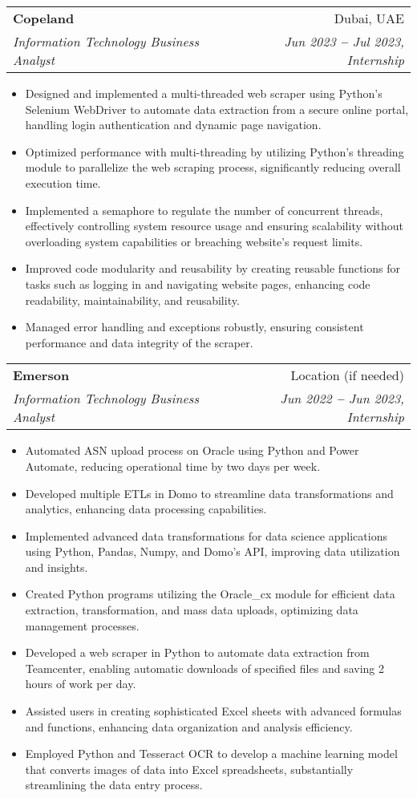 \documentclass[letterpaper,11pt]{article}
\makeatletter
\newcommand{\resumeItem}[1]{
  \item\small{
    {#1 \vspace{-2pt}}
  }
}
\newcommand{\resumeSubheading}[4]{
  \vspace{-2pt}\item
    \begin{tabular*}{0.97\textwidth}[t]{l@{\extracolsep{\fill}}r}
      \textbf{#1} & #2 \\
      \textit{\small#3} & \textit{\small #4} \\
    \end{tabular*}\vspace{-7pt}
}
\newcommand{\resumeItemListStart}{\begin{itemize}}
\newcommand{\resumeItemListEnd}{\end{itemize}\vspace{-5pt}}
\makeatother
\begin{document}
            \vspace{20pt}
            \resumeSubheading
            {Copeland}{Dubai, UAE}
            {Information Technology Business Analyst}{Jun 2023 \textbf{--} Jul 2023, Internship}
              \resumeItemListStart
                  \resumeItem{Designed and implemented a multi-threaded web scraper using Python's Selenium WebDriver to automate data extraction from a secure online portal, handling login authentication and dynamic page navigation.}
                  \resumeItem{Optimized performance with multi-threading by utilizing Python's threading module to parallelize the web scraping process, significantly reducing overall execution time.}
                  \resumeItem{Implemented a semaphore to regulate the number of concurrent threads, effectively controlling system resource usage and ensuring scalability without overloading system capabilities or breaching website's request limits.}
                  \resumeItem{Improved code modularity and reusability by creating reusable functions for tasks such as logging in and navigating website pages, enhancing code readability, maintainability, and reusability.}
                  \resumeItem{Managed error handling and exceptions robustly, ensuring consistent performance and data integrity of the scraper.}
              \resumeItemListEnd
          

            \vspace{20pt}
            \resumeSubheading
            {Emerson}{Location (if needed)}
            {Information Technology Business Analyst}{Jun 2022 \textbf{--} Jun 2023, Internship}
              \resumeItemListStart
                  \resumeItem{Automated ASN upload process on Oracle using Python and Power Automate, reducing operational time by two days per week.}
                  \resumeItem{Developed multiple ETLs in Domo to streamline data transformations and analytics, enhancing data processing capabilities.}
                  \resumeItem{Implemented advanced data transformations for data science applications using Python, Pandas, Numpy, and Domo's API, improving data utilization and insights.}
                  \resumeItem{Created Python programs utilizing the Oracle\_cx module for efficient data extraction, transformation, and mass data uploads, optimizing data management processes.}
                  \resumeItem{Developed a web scraper in Python to automate data extraction from Teamcenter, enabling automatic downloads of specified files and saving 2 hours of work per day.}
                  \resumeItem{Assisted users in creating sophisticated Excel sheets with advanced formulas and functions, enhancing data organization and analysis efficiency.}
                  \resumeItem{Employed Python and Tesseract OCR to develop a machine learning model that converts images of data into Excel spreadsheets, substantially streamlining the data entry process.}
              \resumeItemListEnd
\end{document}
